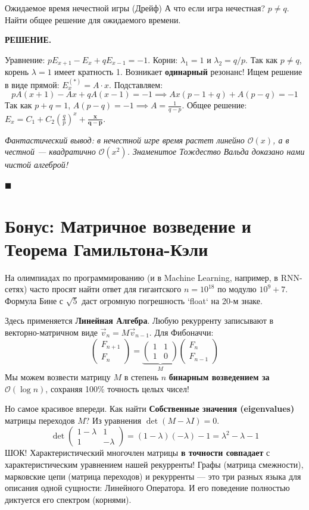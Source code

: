 \documentclass[12pt,a4paper]{article}
\newenvironment{solution}{
    \begin{tcolorbox}[
        enhanced, breakable, blanker,
        borderline west={2.5pt}{0pt}{solgray},
        left=12pt, top=5pt, bottom=5pt,
        before skip=10pt, after skip=15pt
    ]
    \textbf{\textsf{РЕШЕНИЕ.}}\;
}{
    \hfill $\blacksquare$
    \end{tcolorbox}
}
\begin{document}
\begin{problem}{Ожидаемое время нечестной игры (Дрейф)}{}
А что если игра нечестная? $p \neq q$. Найти общее решение для ожидаемого времени.
\end{problem}
\begin{solution}
Уравнение: $p E_{x+1} - E_x + q E_{x-1} = -1$. Корни: $\lambda_1 = 1$ и $\lambda_2 = q/p$.
Так как $p \neq q$, корень $\lambda=1$ имеет кратность 1. Возникает \textbf{одинарный} резонанс! Ищем решение в виде прямой: $E_x^{(*)} = A \cdot x$. Подставляем:
\[ p A(x+1) - Ax + q A(x-1) = -1 \implies Ax(p-1+q) + A(p-q) = -1 \]
Так как $p+q=1$, $A(p - q) = -1 \implies A = \frac{1}{q-p}$.
Общее решение: $E_x = C_1 + C_2 \left(\frac{q}{p}\right)^x + \mathbf{\frac{x}{q-p}}$. 

\textit{Фантастический вывод: в нечестной игре время растет линейно $\mathcal{O}(x)$, а в честной — квадратично $\mathcal{O}(x^2)$. Знаменитое Тождество Вальда доказано нами чистой алгеброй!}
\end{solution}

\newpage
\section{Бонус: Матричное возведение и Теорема Гамильтона-Кэли}

На олимпиадах по программированию (и в Machine Learning, например, в RNN-сетях) часто просят найти ответ для гигантского $n=10^{18}$ по модулю $10^9+7$. Формула Бине с $\sqrt{5}$ даст огромную погрешность `float` на 20-м знаке.

Здесь применяется \textbf{Линейная Алгебра}. Любую рекурренту записывают в векторно-матричном виде $\vec{v}_n = M \vec{v}_{n-1}$. Для Фибоначчи:
\[
\begin{pmatrix} F_{n+1} \\ F_n \end{pmatrix} = 
\underbrace{\begin{pmatrix} 1 & 1 \\ 1 & 0 \end{pmatrix}}_{M}
\begin{pmatrix} F_n \\ F_{n-1} \end{pmatrix}
\]
Мы можем возвести матрицу $M$ в степень $n$ \textbf{бинарным возведением за $\mathcal{O}(\log n)$}, сохраняя 100\% точность целых чисел!

Но самое красивое впереди. Как найти \textbf{Собственные значения (eigenvalues)} матрицы переходов $M$? Из уравнения $\det(M - \lambda I) = 0$.
\[
\det \begin{pmatrix} 1-\lambda & 1 \\ 1 & -\lambda \end{pmatrix} = (1-\lambda)(-\lambda) - 1 = \lambda^2 - \lambda - 1
\]
ШОК! Характеристический многочлен матрицы \textbf{в точности совпадает} с характеристическим уравнением нашей рекурренты! Графы (матрица смежности), марковские цепи (матрица переходов) и рекурренты — это три разных языка для описания одной сущности: Линейного Оператора. И его поведение полностью диктуется его спектром (корнями).
\end{document}
